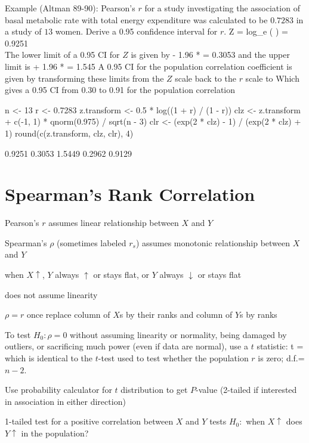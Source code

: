  \item Example (Altman 89-90): Pearson's $r$ for a study investigating the association of basal metabolic rate with total energy expenditure was calculated to be $0.7283$ in a study of $13$ women.  Derive a 0.95 confidence interval for $r$.
\beq
 Z =  \textrm{log}_\textrm{e} \left(  \right) = 0.9251 \\
\eeq
The lower limit of a 0.95 CI for $Z$ is given by
 - 1.96 *  = 0.3053
\eeq
and the upper limit is
 + 1.96 *  = 1.545
\eeq
A 0.95 CI for the population correlation coefficient is given by transforming these limits from the $Z$ scale back to the $r$ scale
\beq
   \hspace{.5cm} \textrm{to} \hspace{.5cm}  
\eeq
Which gives a 0.95 CI from 0.30 to 0.91 for the population correlation
\ei
\begin{Schunk}
\begin{Sinput}
n <- 13
r <- 0.7283
z.transform <- 0.5 * log((1 + r) / (1 - r))
clz <- z.transform + c(-1, 1) * qnorm(0.975) / sqrt(n - 3)
clr <- (exp(2 * clz) - 1) / (exp(2 * clz) + 1)
round(c(z.transform, clz, clr), 4)
\end{Sinput}
\begin{Soutput}
[1] 0.9251 0.3053 1.5449 0.2962 0.9129
\end{Soutput}
\end{Schunk}

\section{Spearman's Rank Correlation}  
\bi
\item Pearson's $r$ assumes linear relationship between $X$ and $Y$
\item Spearman's $\rho$ (sometimes labeled $r_{s}$) assumes monotonic
  relationship between $X$ and $Y$ 
 \bi
 \item when $X \uparrow$, $Y$ always $\uparrow$ or stays flat, or $Y$
   always $\downarrow$ or stays flat
 \item does not assume linearity
 \ei
\item $\rho = r$ once replace column of $X$s by their ranks and column
  of $Y$s by ranks
\item To test $H_{0}:\rho=0$ without assuming linearity or normality,
  being damaged by outliers, or sacrificing much power (even if data are
  normal), use a $t$ statistic:
\beq
t = 
\eeq
which is identical to the $t$-test used to test whether the population
$r$ is zero; d.f.=$n-2$.
\item Use probability calculator for $t$ distribution to get $P$-value
  (2-tailed if interested in association in either direction)
\item 1-tailed test for a positive correlation between $X$ and $Y$
  tests $H_{0}:$ when $X \uparrow$ does $Y \uparrow$ in the population?
\ei

